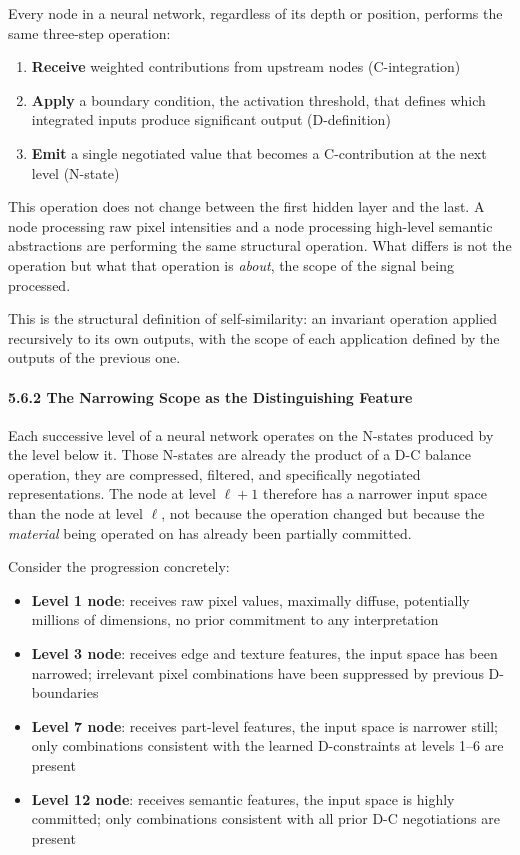\documentclass[12pt]{article}
\providecommand{\tightlist}{%
  \setlength{\itemsep}{0pt}\setlength{\parskip}{0pt}}
\begin{document}
Every node in a neural network, regardless of its depth or position,
performs the same three-step operation:

\begin{enumerate}
\def\labelenumi{\arabic{enumi}.}
\tightlist
\item
  \textbf{Receive} weighted contributions from upstream nodes
  (C-integration)
\item
  \textbf{Apply} a boundary condition, the activation threshold, that
  defines which integrated inputs produce significant output
  (D-definition)
\item
  \textbf{Emit} a single negotiated value that becomes a C-contribution
  at the next level (N-state)
\end{enumerate}

This operation does not change between the first hidden layer and the
last. A node processing raw pixel intensities and a node processing
high-level semantic abstractions are performing the same structural
operation. What differs is not the operation but what that operation is
\emph{about}, the scope of the signal being processed.

This is the structural definition of self-similarity: an invariant
operation applied recursively to its own outputs, with the scope of each
application defined by the outputs of the previous one.

\paragraph{5.6.2 The Narrowing Scope as the Distinguishing
Feature}\label{the-narrowing-scope-as-the-distinguishing-feature}

Each successive level of a neural network operates on the N-states
produced by the level below it. Those N-states are already the product
of a D-C balance operation, they are compressed, filtered, and
specifically negotiated representations. The node at level \(\ell+1\)
therefore has a narrower input space than the node at level \(\ell\),
not because the operation changed but because the \emph{material} being
operated on has already been partially committed.

Consider the progression concretely:

\begin{itemize}
\tightlist
\item
  \textbf{Level 1 node}: receives raw pixel values, maximally diffuse,
  potentially millions of dimensions, no prior commitment to any
  interpretation
\item
  \textbf{Level 3 node}: receives edge and texture features, the input
  space has been narrowed; irrelevant pixel combinations have been
  suppressed by previous D-boundaries
\item
  \textbf{Level 7 node}: receives part-level features, the input space
  is narrower still; only combinations consistent with the learned
  D-constraints at levels 1--6 are present
\item
  \textbf{Level 12 node}: receives semantic features, the input space is
  highly committed; only combinations consistent with all prior D-C
  negotiations are present
\end{itemize}
\end{document}
